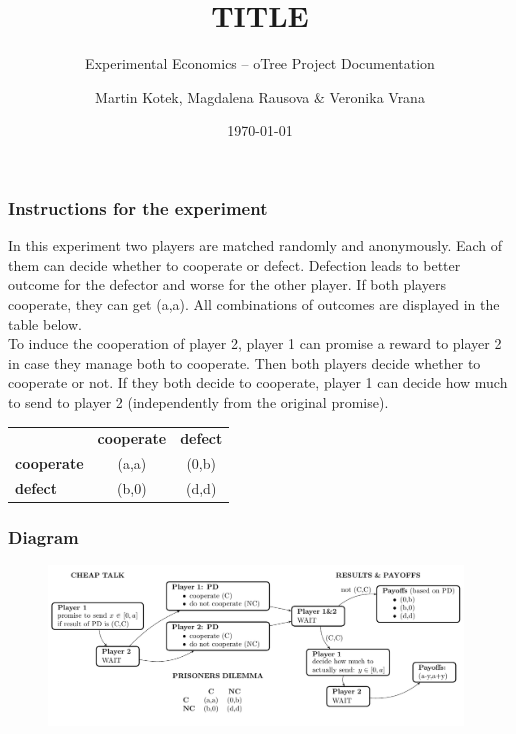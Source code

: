 \documentclass{beamer}
\title{TITLE}
\subtitle{Experimental Economics -- oTree Project Documentation}
\author{Martin Kotek, Magdalena Rausova \& Veronika Vrana}
\date{\today}
\begin{document}
\frame{\titlepage} 



\begin{frame}
\frametitle{Instructions for the experiment}

\justify
In this experiment two players are matched randomly and anonymously. Each of them can decide whether to cooperate or defect. Defection leads to better outcome for the defector and worse for the other player. If both players cooperate, they can get (a,a). All combinations of outcomes are displayed in the table below.\\

To induce the cooperation of player 2, player 1 can promise a reward to player 2 in case they manage both to cooperate. Then both players decide whether to cooperate or not. If they both decide to cooperate, player 1 can decide how much to send to player 2 (independently from the original promise).\\

\begin{center}
   \begin{tabular}{lcc}
     & \textbf{cooperate} &  \textbf{defect} \\
      \textbf{cooperate} &  (a,a) & (0,b) \\
      \textbf{defect} & (b,0) & (d,d) \\    
 \end{tabular}
\end{center}

\end{frame}




\begin{frame}
\frametitle{Diagram} 

\begin{figure}[!htbp]
\begin{center}\vspace{-0.5cm}
\includegraphics[width=110mm]{diagram.pdf}
\end{center}\vspace{-0.5cm}
\end{figure}

\end{frame}
\end{document}
